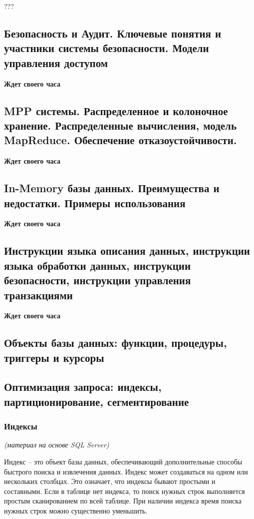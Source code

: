 ???


\subsection{Безопасность и Аудит. Ключевые понятия и участники системы безопасности. Модели управления доступом}

\textbf{Ждет своего часа}


\subsection{MPP системы. Распределенное и колоночное хранение. Распределенные вычисления, модель MapReduce. Обеспечение отказоустойчивости.}

\textbf{Ждет своего часа}

\subsection{In-Memory базы данных. Преимущества и недостатки. Примеры использования}

\textbf{Ждет своего часа}

\subsection{Инструкции языка описания данных, инструкции языка обработки данных, инструкции безопасности, инструкции управления транзакциями}

\textbf{Ждет своего часа}



\subsection{Объекты базы данных: функции, процедуры, триггеры и курсоры}


\subsection{Оптимизация запроса: индексы, партиционирование, сегментирование}

\subsubsection{Индексы}
\textit{(материал на основе SQL Server)}

Индекс – это объект базы данных, обеспечивающий дополнительные способы быстрого поиска и извлечения данных. Индекс может создаваться на одном или нескольких столбцах. 
Это означает, что индексы бывают простыми и составными. Если в таблице нет индекса, то поиск нужных строк выполняется простым сканированием по всей таблице. При наличии индекса время поиска нужных строк можно существенно уменьшить. 

